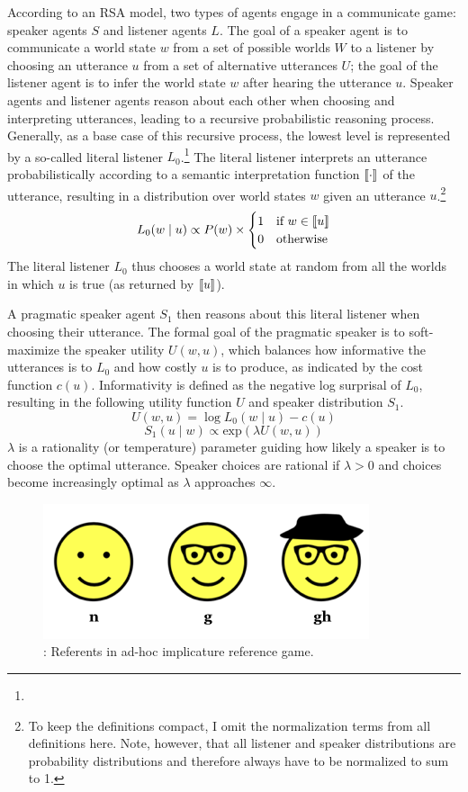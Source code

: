 According to an RSA model, two types of agents engage in a communicate game: speaker agents $S$ and listener agents $L$. The goal of a speaker agent is to communicate
a world state $w$ from a set of possible worlds $W$ to a listener by choosing an utterance $u$ from a set of alternative utterances $U$; the goal of the listener agent is to infer the world 
state $w$ after hearing the utterance $u$. Speaker agents and listener agents reason about each other when choosing and interpreting utterances, leading to a
recursive probabilistic reasoning process. Generally, as a base case of this recursive process, the lowest level is represented by a so-called literal listener $L_0$.\footnote{
}
The literal listener interprets an utterance probabilistically according to a semantic interpretation function $\llbracket\cdot\rrbracket$ of the utterance, 
resulting in a distribution over world states $w$ given an utterance $u$.\footnote{To keep the definitions compact, I omit the normalization terms from all definitions here. 
Note, however, that all listener and speaker distributions are probability distributions and therefore always have to be normalized to sum to 1.}
$$L_0(w \mid u) \propto P(w) \times 
\begin{cases}
1 & \mbox{if } w \in \llbracket u\rrbracket \\
0 & \mbox{otherwise} 
\end{cases}$$
The literal listener $L_0$ thus chooses a world state at random from all the worlds in which $u$ is true (as returned by $\llbracket u\rrbracket$).

A pragmatic speaker agent $S_1$ then reasons about this literal listener when choosing their utterance. The formal goal of the 
pragmatic speaker is to soft-maximize \cite{Luce1959,Sutton1998} the speaker utility $U(w,u)$, which balances how informative the utterances is to $L_0$ and
how costly $u$ is to produce, as indicated by the cost function $c(u)$. Informativity is defined as the negative log surprisal of $L_0$, resulting
in the following utility function $U$ and speaker distribution $S_1$.
$$U(w,u) = \log L_0(w \mid u) - c(u)$$
$$S_1(u \mid w) \propto \mbox{exp} \left( \lambda U(w,u) \right)$$
$\lambda$ is a rationality (or temperature) parameter guiding how likely a speaker is to choose the optimal utterance. 
Speaker choices are rational if $\lambda > 0$ and choices become increasingly optimal as $\lambda$ approaches $\infty$.

\begin{figure}
\center
\includegraphics[width=.5\textwidth]{plots/faces-ad-hoc-implicature.png}
\caption{\label{fig:faces-ad-hoc-imp}: Referents in ad-hoc implicature reference game.}
\end{figure}

